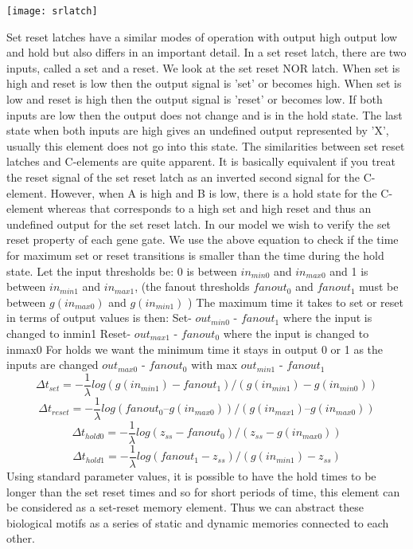 \documentclass{article}
\begin{document}
\newline 
\begin{center}
\texttt{[image: srlatch]}
\end{center}
Set reset latches have a similar modes of operation with output high output low and hold but also differs in an important detail.  In a set reset latch, there are two inputs, called a set and a reset.  We look at the set reset NOR latch.  When set is high and reset is low then the output signal is 'set' or becomes high.  When set is low and reset is high then the output signal is 'reset' or becomes low.  If both inputs are low then the output does not change and is in the hold state.  The last state when both inputs are high gives an undefined output represented by 'X', usually this element does not go into this state.  The similarities between set reset latches and C-elements are quite apparent.  It is basically equivalent if you treat the reset signal of the set reset latch as an inverted second signal for the C-element.  However, when A is high and B is low, there is a hold state for the C-element whereas that corresponds to a high set and high reset and thus an undefined output for the set reset latch.
\newline  \newline
In our model we wish to verify the set reset property of each gene gate.  We use the above equation to check if the time for maximum set or reset transitions is smaller than the time during the hold state.  
Let the input thresholds be:  0 is between $in_{min0}$ and $in_{max0}$ and 1 is between $in_{min1}$ and $in_{max1}$, (the fanout thresholds $fanout_0$ and $fanout_1$ must be between $g(in_{max0})$ and $g(in_{min1})$ )
The maximum time it takes to set or reset in terms of output values is then: \newline
Set- $out_{min0}$ - $fanout_1$ where the input is changed to inmin1 \newline
Reset- $out_{max1}$ - $fanout_0$ where the input is changed to inmax0 \newline
For holds we want the minimum time it stays in output 0 or 1 as the inputs are changed \newline
$out_{max0}$ - $fanout_0$ with max \newline
$out_{min1}$ - $fanout_1$ \newline
\[\Delta t_{set}= - \frac{1}{\lambda} log(g(in_{min1})-fanout_1)/(g(in_{min1}) -g(in_{min0}))
\]
\[\Delta t_{reset}= -\frac{1}{\lambda} log(fanout_0 –g(in_{max0}))/(g(in_{max1}) – g(in_{max0}))
\]
\[\Delta t_{hold0}= -\frac{1}{\lambda} log(z_{ss} -fanout_0)/(z_{ss} -g(in_{max0}))				
\]
\[\Delta t_{hold1}= -\frac{1}{\lambda} log(fanout_1 -z_{ss})/(g(in_{min1}) -z_{ss})
\]
Using standard parameter values, it is possible to have the hold times to be longer than the set reset times and so for short periods of time, this element can be considered as a set-reset memory element.  Thus we can abstract these biological motifs as a series of static and dynamic memories connected to each other.
\end{document}

